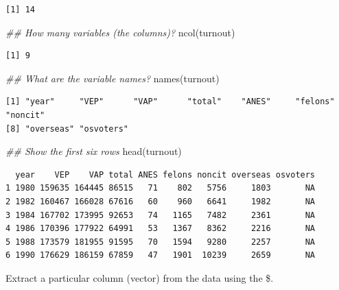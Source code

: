 \documentclass[
  letterpaper,
  DIV=11,
  numbers=noendperiod]{scrreprt}
\newenvironment{Shaded}{\begin{snugshade}}{\end{snugshade}}
\newcommand{\DocumentationTok}[1]{\textcolor[rgb]{0.37,0.37,0.37}{\textit{#1}}}
\newcommand{\FunctionTok}[1]{\textcolor[rgb]{0.28,0.35,0.67}{#1}}
\newcommand{\NormalTok}[1]{\textcolor[rgb]{0.00,0.23,0.31}{#1}}
\newcommand{\SpecialCharTok}[1]{\textcolor[rgb]{0.37,0.37,0.37}{#1}}
\begin{document}
\begin{verbatim}
[1] 14
\end{verbatim}

\begin{Shaded}
\begin{Highlighting}[]
\DocumentationTok{\#\# How many variables (the columns)?}
\FunctionTok{ncol}\NormalTok{(turnout)}
\end{Highlighting}
\end{Shaded}

\begin{verbatim}
[1] 9
\end{verbatim}

\begin{Shaded}
\begin{Highlighting}[]
\DocumentationTok{\#\# What are the variable names?}
\FunctionTok{names}\NormalTok{(turnout)}
\end{Highlighting}
\end{Shaded}

\begin{verbatim}
[1] "year"     "VEP"      "VAP"      "total"    "ANES"     "felons"   "noncit"  
[8] "overseas" "osvoters"
\end{verbatim}

\begin{Shaded}
\begin{Highlighting}[]
\DocumentationTok{\#\# Show the first six rows}
\FunctionTok{head}\NormalTok{(turnout)}
\end{Highlighting}
\end{Shaded}

\begin{verbatim}
  year    VEP    VAP total ANES felons noncit overseas osvoters
1 1980 159635 164445 86515   71    802   5756     1803       NA
2 1982 160467 166028 67616   60    960   6641     1982       NA
3 1984 167702 173995 92653   74   1165   7482     2361       NA
4 1986 170396 177922 64991   53   1367   8362     2216       NA
5 1988 173579 181955 91595   70   1594   9280     2257       NA
6 1990 176629 186159 67859   47   1901  10239     2659       NA
\end{verbatim}

Extract a particular column (vector) from the data using the \$.

\begin{Shaded}
\end{Shaded}
\end{document}
